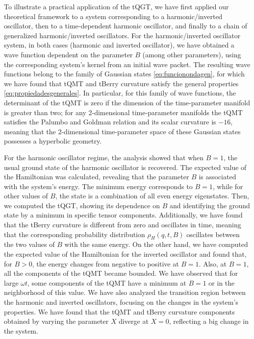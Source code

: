 \documentclass[12pt]{iopart}
\begin{document}
To illustrate a practical application of the tQGT, we have first applied our theoretical framework to a system corresponding to a harmonic/inverted oscillator, then to a time-dependent harmonic oscillator, and finally to a chain of generalized harmonic/inverted oscillators. For the harmonic/inverted oscillator system, in both cases (harmonic and inverted oscillator), we have obtained a wave function dependent on the parameter $B$ (among other parameters), using the corresponding system's kernel from an initial wave packet. The resulting wave functions belong to the family of  Gaussian states \eqref{eq:funcionondagen}, for which we have found that tQMT and tBerry curvature satisfy the general properties \eqref{eq:propiedadesgenerales}. In particular, for this family of wave functions, the determinant of the tQMT is zero if the dimension of the time-parameter manifold is greater than two; for any 2-dimensional time-parameter manifolds the tQMT satisfies the Palumbo and Goldman relation and its scalar curvature is $-16$, meaning that the 2-dimensional time-parameter space of these Gaussian states possesses a hyperbolic geometry. 

For the harmonic oscillator regime, the analysis showed that when $B = 1$, the usual ground state of the harmonic oscillator is recovered. The expected value of the Hamiltonian was calculated, revealing that the parameter $B$ is associated with the system's energy. The minimum energy corresponds to $B = 1$, while for other values of $B$, the state is a combination of all even energy eigenstates. Then, we computed the tQGT, showing its dependence on $B$ and identifying the ground state by a minimum in specific tensor components. Additionally, we have found that the tBerry curvature is different from zero and oscillates in time, meaning that the corresponding probability distribution $\rho_H(q, t, B)$ oscillates between the two values of $B$ with the same energy.  On the other hand, we have computed the expected value of the Hamiltonian for the inverted oscillator and found that, for $B>0$, the energy changes from negative to positive at $B=1$. Also, at $B=1$, all the components of the tQMT became bounded. We have observed that for large $\omega t$, some components of the tQMT have a minimum at $B=1$ or in the neighborhood of this value. We have also analyzed the transition region between the harmonic and inverted oscillators, focusing on the changes in the system's properties. We have found that the tQMT and tBerry curvature components obtained by varying the parameter $X$ diverge at $X = 0$, reflecting a big change in the system. 
\end{document}
